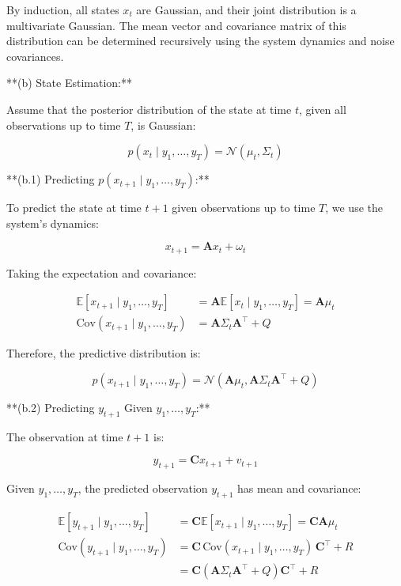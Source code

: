\documentclass[12pt]{article}
\begin{document}
By induction, all states \( x_t \) are Gaussian, and their joint distribution is a multivariate Gaussian. The mean vector and covariance matrix of this distribution can be determined recursively using the system dynamics and noise covariances.

**(b) State Estimation:**

Assume that the posterior distribution of the state at time \( t \), given all observations up to time \( T \), is Gaussian:

\[
p(x_t \mid y_1, \dots, y_T) = \mathcal{N}(\mu_t, \Sigma_t)
\]

**(b.1) Predicting \( p(x_{t+1} \mid y_1, \dots, y_T) \):**

To predict the state at time \( t+1 \) given observations up to time \( T \), we use the system's dynamics:

\[
x_{t+1} = \mathbf{A} x_t + \omega_t
\]

Taking the expectation and covariance:

\[
\begin{aligned}
    \mathbb{E}[x_{t+1} \mid y_1, \dots, y_T] &= \mathbf{A} \mathbb{E}[x_t \mid y_1, \dots, y_T] = \mathbf{A} \mu_t \\
    \text{Cov}(x_{t+1} \mid y_1, \dots, y_T) &= \mathbf{A} \Sigma_t \mathbf{A}^\top + Q
\end{aligned}
\]

Therefore, the predictive distribution is:

\[
p(x_{t+1} \mid y_1, \dots, y_T) = \mathcal{N}(\mathbf{A} \mu_t, \mathbf{A} \Sigma_t \mathbf{A}^\top + Q)
\]

**(b.2) Predicting \( y_{t+1} \) Given \( y_1, \dots, y_T \):**

The observation at time \( t+1 \) is:

\[
y_{t+1} = \mathbf{C} x_{t+1} + v_{t+1}
\]

Given \( y_1, \dots, y_T \), the predicted observation \( y_{t+1} \) has mean and covariance:

\[
\begin{aligned}
    \mathbb{E}[y_{t+1} \mid y_1, \dots, y_T] &= \mathbf{C} \mathbb{E}[x_{t+1} \mid y_1, \dots, y_T] = \mathbf{C} \mathbf{A} \mu_t \\
    \text{Cov}(y_{t+1} \mid y_1, \dots, y_T) &= \mathbf{C} \, \text{Cov}(x_{t+1} \mid y_1, \dots, y_T) \, \mathbf{C}^\top + R \\
    &= \mathbf{C} (\mathbf{A} \Sigma_t \mathbf{A}^\top + Q) \mathbf{C}^\top + R
\end{aligned}
\]
\end{document}
